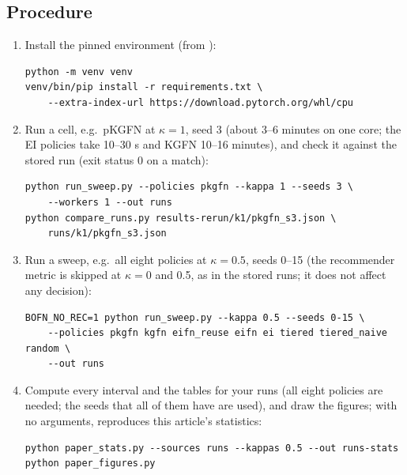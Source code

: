 \documentclass[11pt]{article}
\begin{document}
\subsection*{Procedure}

\begin{enumerate}[leftmargin=*]
\item Install the pinned environment (from ):
\begin{small}
\begin{verbatim}
python -m venv venv
venv/bin/pip install -r requirements.txt \
    --extra-index-url https://download.pytorch.org/whl/cpu
\end{verbatim}
\end{small}
\item Run a cell, e.g.\ pKGFN at $\kappa=1$, seed 3 (about 3--6 minutes on one
core; the EI policies take 10--30 s and KGFN 10--16 minutes), and check it
against the stored run (exit status 0 on a match):
\begin{small}
\begin{verbatim}
python run_sweep.py --policies pkgfn --kappa 1 --seeds 3 \
    --workers 1 --out runs
python compare_runs.py results-rerun/k1/pkgfn_s3.json \
    runs/k1/pkgfn_s3.json
\end{verbatim}
\end{small}
\item Run a sweep, e.g.\ all eight policies at $\kappa=0.5$, seeds 0--15 (the
recommender metric is skipped at $\kappa=0$ and 0.5, as in the stored runs; it
does not affect any decision):
\begin{small}
\begin{verbatim}
BOFN_NO_REC=1 python run_sweep.py --kappa 0.5 --seeds 0-15 \
    --policies pkgfn kgfn eifn_reuse eifn ei tiered tiered_naive random \
    --out runs
\end{verbatim}
\end{small}
\item Compute every interval and the tables for your runs (all eight policies are
needed; the seeds that all of them have are used), and draw the figures; with no
arguments,  reproduces this article's statistics:
\begin{small}
\begin{verbatim}
python paper_stats.py --sources runs --kappas 0.5 --out runs-stats
python paper_figures.py
\end{verbatim}
\end{small}
\end{enumerate}
\end{document}
